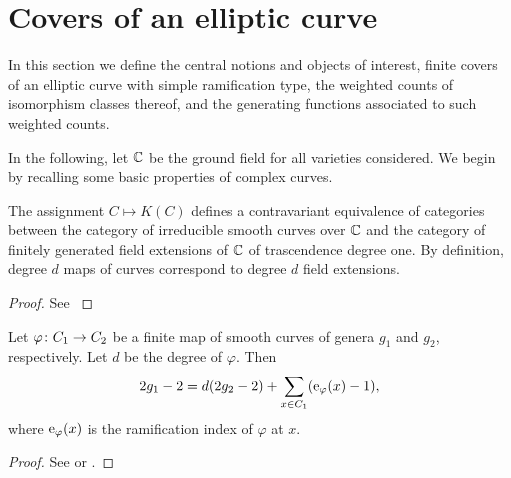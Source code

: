 \section{Covers of an elliptic curve} \label{sec:covers-definitions}

In this section we define the central notions and objects of interest, \ie finite covers of an elliptic curve with simple ramification type, the weighted counts of isomorphism classes thereof, and the generating functions associated to such weighted counts.

In the following, let $\mathbb{C}$ be the ground field for all varieties considered. We begin by recalling some basic properties of complex curves.

\begin{prop} \label{prop:curves-to-fields}
The assignment $C\mapsto K(C)$ defines a contravariant equivalence of categories between the category of irreducible smooth curves over $\mathbb{C}$ 
and the 
category of finitely generated field extensions of $\mathbb{C}$ of trascendence degree one. By definition, degree $d$ maps of curves correspond 
to degree $d$ field extensions.
\end{prop}

\begin{proof}
 See \cite[pp.20-22]{Silverman2009}
\end{proof}

\begin{prop} \label{prop:hurwitz}
 Let $\varphi \colon C_1 \to C_2$ be a finite map of smooth curves of genera $g_1$ and $g_2$, respectively. Let $d$ be the degree of $\varphi$. Then \[2g_1-2 = d(2g_2-2) + 
\sum_{x\in C_1}(\operatorname{e}_{\varphi}(x)-1),\] where $\operatorname{e}_\varphi(x)$ is the ramification index of $\varphi$ at $x$.
\end{prop}

\begin{proof}
 See \cite[Thm.~5.9]{Silverman2009} or \cite[7.2.1]{Lamotke2005}.
\end{proof}

